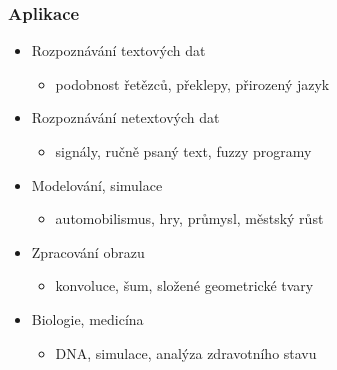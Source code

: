 \documentclass{beamer}
\begin{document}
\begin{frame}	%
\frametitle{Aplikace}
\begin{itemize}
	\item[~] Rozpoznávání textových dat
	\begin{itemize}
		\item podobnost řetězců, překlepy, přirozený jazyk
	\end{itemize}
\end{itemize}
\hfill
\begin{itemize}
	\item[~] Rozpoznávání netextových dat
	\begin{itemize}
		\item signály, ručně psaný text, fuzzy programy
	\end{itemize}
\end{itemize}
\hfill
\begin{itemize}
	\item[~] Modelování, simulace
	\begin{itemize}
		\item automobilismus, hry, průmysl, městský růst
	\end{itemize}
\end{itemize}
\hfill
\begin{itemize}
	\item[~] Zpracování obrazu
	\begin{itemize}
		\item konvoluce, šum, složené geometrické tvary
	\end{itemize}
\end{itemize}
\hfill
\begin{itemize}
	\item[~] Biologie, medicína
	\begin{itemize}
		\item DNA, simulace, analýza zdravotního stavu
	\end{itemize}
\end{itemize}
\hfill
\end{frame}
\end{document}
